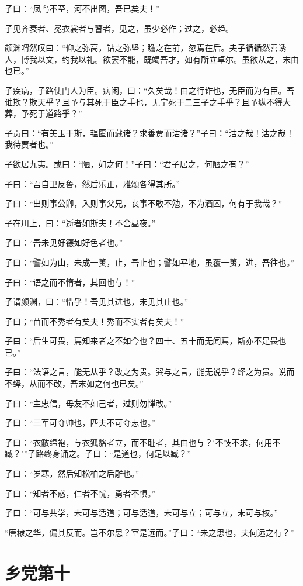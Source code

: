 \documentclass[twoside,openany]{book}
\begin{document}
子曰：“凤鸟不至，河不出图，吾已矣夫！”

子见齐衰者、冕衣裳者与瞽者，见之，虽少必作；过之，必趋。

颜渊喟然叹曰：“仰之弥高，钻之弥坚；瞻之在前，忽焉在后。夫子循循然善诱人，博我以文，约我以礼。欲罢不能，既竭吾才，如有所立卓尔。虽欲从之，末由也已。”

子疾病，子路使门人为臣。病闲，曰：“久矣哉！由之行诈也，无臣而为有臣。吾谁欺？欺天乎？且予与其死于臣之手也，无宁死于二三子之手乎？且予纵不得大葬，予死于道路乎？”

子贡曰：“有美玉于斯，韫匮而藏诸？求善贾而沽诸？”子曰：“沽之哉！沽之哉！我待贾者也。”

子欲居九夷。或曰：“陋，如之何！”子曰：“君子居之，何陋之有？”

子曰：“吾自卫反鲁，然后乐正，雅颂各得其所。”

子曰：“出则事公卿，入则事父兄，丧事不敢不勉，不为酒困，何有于我哉？”

子在川上，曰：“逝者如斯夫！不舍昼夜。”

子曰：“吾未见好德如好色者也。”

子曰：“譬如为山，未成一篑，止，吾止也；譬如平地，虽覆一篑，进，吾往也。”

子曰：“语之而不惰者，其回也与！”

子谓颜渊，曰：“惜乎！吾见其进也，未见其止也。”

子曰；“苗而不秀者有矣夫！秀而不实者有矣夫！”

子曰：“后生可畏，焉知来者之不如今也？四十、五十而无闻焉，斯亦不足畏也已。”

子曰：“法语之言，能无从乎？改之为贵。巽与之言，能无说乎？绎之为贵。说而不绎，从而不改，吾末如之何也已矣。”

子曰：“主忠信，毋友不如己者，过则勿惮改。”

子曰：“三军可夺帅也，匹夫不可夺志也。”

子曰：“衣敝缊袍，与衣狐貉者立，而不耻者，其由也与？‘不忮不求，何用不臧？’”子路终身诵之。子曰：“是道也，何足以臧？”

子曰：“岁寒，然后知松柏之后雕也。”

子曰：“知者不惑，仁者不忧，勇者不惧。”

子曰：“可与共学，未可与适道；可与适道，未可与立；可与立，未可与权。”

“唐棣之华，偏其反而。岂不尔思？室是远而。”子曰：“未之思也，夫何远之有？” 

\chapter{乡党第十}\label{ch10}
\end{document}
